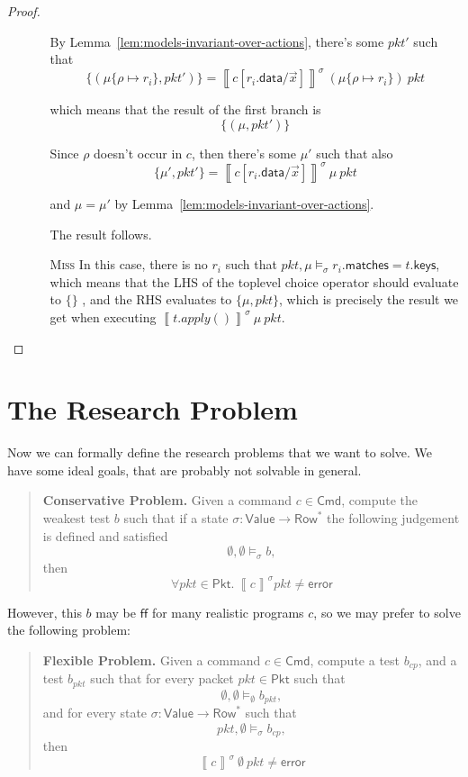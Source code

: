 \documentclass{article}
\newcommand{\pkt}{\mathit{pkt}}
\newcommand{\error}{\mathsf{error}}
\newcommand{\denote}[1]{\left\llbracket#1\right\rrbracket}
\newcommand{\FALSE}{\mathsf{ff}}
\newcommand{\Value}{\mathsf{Value}}
\newcommand{\Cmd}{\mathsf{Cmd}}
\newcommand{\Pkt}{\mathsf{Pkt}}
\newcommand{\Row}{\mathsf{Row}}
\newcommand{\matches}{\mathsf{matches}}
\newcommand{\keys}{\mathsf{keys}}
\newcommand{\data}{\mathsf{data}}
\begin{document}
\begin{proof}
\begin{enumerate}[align=left]
\begin{enumerate}
      By Lemma~\ref{lem:models-invariant-over-actions}, there's some $\pkt'$ such that
      \[\{(\mu\{\rho \mapsto r_i\}, \pkt')\} =
      \denote{c[r_i.\data/\vec x]}^\sigma~(\mu\{\rho \mapsto r_i\})~\pkt
      \]

      which means that the result of the first branch is
      \[\{(\mu, \pkt')\} \]

      Since $\rho$ doesn't occur in $c$, then there's some $\mu'$ such that also
      \[\{\mu', \pkt'\} = \denote{c[r_i.\data/\vec x]}^\sigma~\mu~\pkt \]

      and $\mu = \mu'$ by Lemma~\ref{lem:models-invariant-over-actions}.

      The result follows.

    \item[\textsc{Miss}] In this case, there is no $r_i$ such that $\pkt,\mu
      \models_\sigma r_i.\matches = t.\keys$, which means that the LHS of the
      toplevel choice operator should evaluate to $\{\}$ ,
      and the RHS evaluates to $\{\mu,\pkt\}$, which is
      precisely the result we get when executing
      $\denote{t.apply()}^\sigma~\mu~\pkt$.

    \end{enumerate}

  \end{enumerate}
\end{proof}



\section{The Research Problem}

Now we can formally define the research problems that we want to solve. We have
some ideal goals, that are probably not solvable in general.

\begin{quote}
  \textbf{Conservative Problem.} Given a command $c \in \Cmd$, compute the weakest test
  $b$ such that if a state $\sigma : \Value \to \Row^*$ the following
  judgement is defined and satisfied \[\emptyset, \emptyset \models_\sigma b,\] then \[\forall \pkt \in \Pkt.~
  \denote{c}^\sigma \pkt \neq \error \]
\end{quote}

However, this $b$ may be $\FALSE$ for many realistic programs $c$, so we may
prefer to solve the following problem:

\begin{quote}
  \textbf{Flexible Problem.} Given a command $c \in \Cmd$, compute a test
  $b_{\mathit{cp}}$, and a test $b_{\mathit{pkt}}$ such that
  for every packet $\pkt \in \Pkt$ such that
  \[\emptyset, \emptyset \models_\emptyset b_{\mathit{pkt}},\]
  and for every state $\sigma : \Value \to \Row^*$ such that
  \[\pkt, \emptyset \models_\sigma b_{\mathit{cp}},\]
  then \[\denote{c}^\sigma ~\emptyset~\pkt \neq \error \]
\end{quote}
\end{document}
